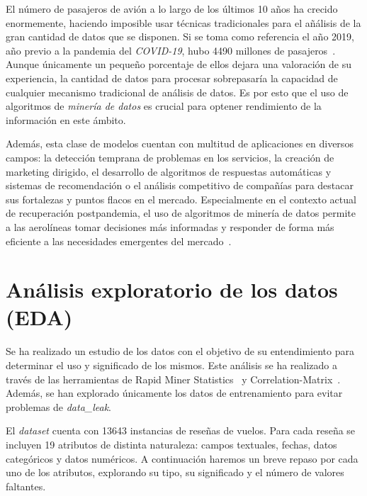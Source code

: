 \documentclass[es]{uc3mreport}
\begin{document}
\begin{report}
El número de pasajeros de avión a lo largo de los últimos 10 años ha crecido
enormemente, haciendo imposible usar técnicas tradicionales para el añálisis de
la gran cantidad de datos que se disponen. Si se toma como referencia el año
2019, año previo a la pandemia del \textit{COVID-19}, hubo 4490 millones de
pasajeros~\cite{owd-passengers}. Aunque únicamente un pequeño porcentaje de
ellos dejara una valoración de su experiencia, la cantidad de datos para
procesar sobrepasaría la capacidad de cualquier mecanismo tradicional de
análisis de datos. Es por esto que el uso de algoritmos de \textit{minería de datos} es crucial para optener rendimiento de la información en este ámbito.

Además, esta clase de modelos cuentan con multitud de aplicaciones en diversos campos: la detección temprana de problemas en los servicios, la creación de marketing dirigido, el desarrollo de algoritmos de respuestas automáticas y sistemas de recomendación o el análisis competitivo de compañías para destacar sus fortalezas y puntos flacos en el mercado. Especialmente en el contexto actual de recuperación postpandemia, el uso de algoritmos de minería de datos permite a las aerolíneas tomar decisiones más informadas y responder de forma más eficiente a las necesidades emergentes del mercado~\cite{espanna}.

\section{Análisis exploratorio de los datos (EDA)}
\label{chap:eda}
Se ha realizado un estudio de los datos con el objetivo de su entendimiento para determinar el uso y significado de los mismos. Este análisis se ha realizado a través de las herramientas de Rapid Miner Statistics~\cite{Statistics-RM} y Correlation-Matrix~\cite{Correlation-Matrix-RM}. Además, se han explorado únicamente los datos de entrenamiento para evitar problemas de \textit{data\_leak}.

El \textit{dataset} cuenta con 13643 instancias de reseñas de vuelos. Para cada reseña se incluyen 19 atributos de distinta naturaleza: campos textuales, fechas, datos categóricos y datos numéricos. A continuación haremos un breve repaso por cada uno de los atributos, explorando su tipo, su significado y el número de valores faltantes.


\end{report}
\end{document}
